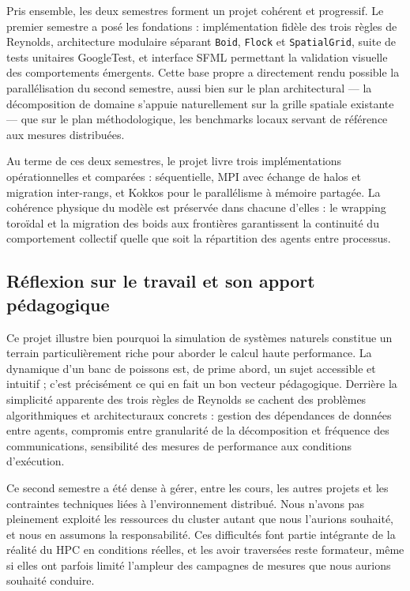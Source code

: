 \documentclass[conference]{IEEEtran}
\begin{document}
Pris ensemble, les deux semestres forment un projet cohérent et progressif.
Le premier semestre a posé les fondations : implémentation fidèle des trois
règles de Reynolds, architecture modulaire séparant \texttt{Boid},
\texttt{Flock} et \texttt{SpatialGrid}, suite de tests unitaires
GoogleTest, et interface SFML permettant la validation visuelle des
comportements émergents. Cette base propre a directement rendu possible
la parallélisation du second semestre, aussi bien sur le plan architectural
— la décomposition de domaine s'appuie naturellement sur la grille spatiale
existante — que sur le plan méthodologique, les benchmarks locaux servant
de référence aux mesures distribuées.

Au terme de ces deux semestres, le projet livre trois implémentations
opérationnelles et comparées : séquentielle, MPI avec échange de halos
et migration inter-rangs, et Kokkos pour le parallélisme à mémoire
partagée. La cohérence physique du modèle est préservée dans chacune
d'elles : le wrapping toroïdal et la migration des boids aux frontières
garantissent la continuité du comportement collectif quelle que soit la
répartition des agents entre processus.

\subsection*{Réflexion sur le travail et son apport pédagogique}

Ce projet illustre bien pourquoi la simulation de systèmes naturels
constitue un terrain particulièrement riche pour aborder le calcul haute
performance. La dynamique d'un banc de poissons est, de prime abord, un
sujet accessible et intuitif ; c'est précisément ce qui en fait un bon
vecteur pédagogique. Derrière la simplicité apparente des trois règles
de Reynolds se cachent des problèmes algorithmiques et architecturaux
concrets : gestion des dépendances de données entre agents, compromis
entre granularité de la décomposition et fréquence des communications,
sensibilité des mesures de performance aux conditions d'exécution.

Ce second semestre a été dense à gérer, entre les cours, les autres
projets et les contraintes techniques liées à l'environnement distribué.
Nous n'avons pas pleinement exploité les ressources du cluster autant
que nous l'aurions souhaité, et nous en assumons la responsabilité. Ces difficultés font partie intégrante de la réalité du HPC en conditions
réelles, et les avoir traversées reste formateur, même si elles ont
parfois limité l'ampleur des campagnes de mesures que nous aurions
souhaité conduire.
\end{document}
